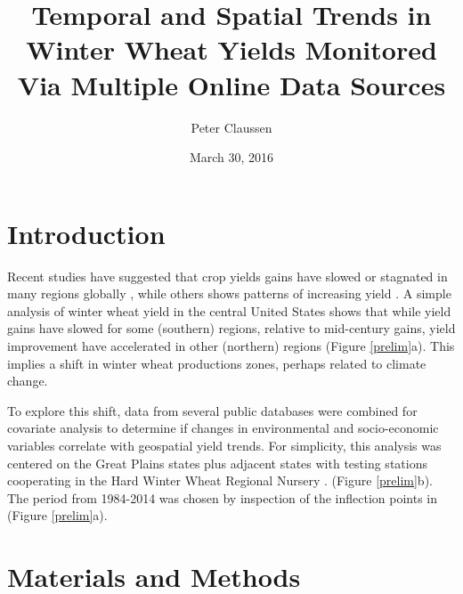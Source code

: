 \documentclass{article}
\begin{document}
\title{Temporal and Spatial Trends in Winter Wheat Yields Monitored Via
Multiple Online Data Sources}

\author{Peter Claussen}

\date{March 30, 2016}

\maketitle

\section{Introduction}

Recent studies have suggested that crop yields gains have slowed or stagnated
in many regions globally {\cite{lin.m-07-2012,graybosch.r-2014}}, while others
shows patterns of increasing yield {\cite{ray.d-12-2012}} . A simple analysis
of winter wheat yield in the central United States shows that while yield
gains have slowed for some (southern) regions, relative to mid-century gains,
yield improvement have accelerated in other (northern) regions (Figure
\ref{prelim}a). This implies a shift in winter wheat productions zones,
perhaps related to climate change.

To explore this shift, data from several public databases were combined for
covariate analysis to determine if changes in environmental and socio-economic
variables correlate with geospatial yield trends. For simplicity, this
analysis was centered on the Great Plains states plus adjacent states with
testing stations cooperating in the Hard Winter Wheat Regional Nursery
{\cite{hww-rpn}}. (Figure \ref{prelim}b). The period from 1984-2014 was chosen
by inspection of the inflection points in (Figure \ref{prelim}a).
\begin{center}
  {}\label{prelim}
\end{center}

\section{Materials and Methods}
\end{document}
